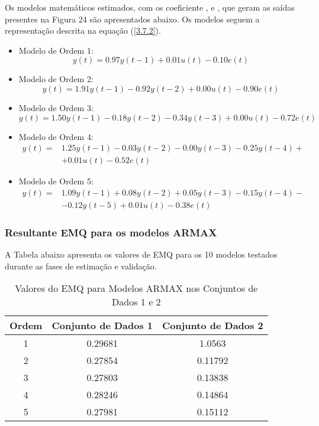 \documentclass[a4paper,12pt]{article}
\begin{document}
Os modelos matemáticos estimados, com os coeficiente ,  e , que geram as saídas presentes na Figura 24 são apresentados abaixo. Os modelos seguem a representação descrita na equação (\ref{3.7.2}).
\begin{itemize}
    \item Modelo de Ordem 1:
    \begin{equation*}
    y(t) = 0.97y(t-1) + 0.01u(t) - 0.10e(t)
    \end{equation*}
    
    \item Modelo de Ordem 2:
    \begin{equation*}
    y(t) = 1.91y(t-1) - 0.92y(t-2) + 0.00u(t) - 0.90e(t)
    \end{equation*}
    
    \item Modelo de Ordem 3:
    \begin{equation*}
    y(t) = 1.50y(t-1) - 0.18y(t-2) - 0.34y(t-3) + 0.00u(t) - 0.72e(t)
    \end{equation*}
    
    \item Modelo de Ordem 4:
    \begin{align}
    y(t) = &1.25y(t-1) - 0.03y(t-2) - 0.00y(t-3) - 0.25y(t-4) + \nonumber\\
    & + 0.01u(t) - 0.52e(t) \nonumber
    \end{align}
    
    \item Modelo de Ordem 5:
    \begin{align}
    y(t) = &1.09y(t-1) + 0.08y(t-2) + 0.05y(t-3) - 0.15y(t-4) -\nonumber \\
    & - 0.12y(t-5) + 0.01u(t) - 0.38e(t) \nonumber
    \end{align}
\end{itemize}

\subsubsection{Resultante EMQ para os modelos ARMAX}

A Tabela abaixo apresenta os valores de EMQ para os 10 modelos testados durante as fases de estimação e validação.

\begin{table}[h!]
    \centering
    \label{tab:emq_results_armax}
    \begin{tabular}{|c|c|c|}
        \hline
        Ordem & Conjunto de Dados 1 & Conjunto de Dados 2 \\
        \hline
        1 & 0.29681 & 1.0563 \\
        2 & 0.27854 & 0.11792 \\
        3 & 0.27803 & 0.13838 \\
        4 & 0.28246 & 0.14864 \\
        5 & 0.27981 & 0.15112 \\
        \hline
    \end{tabular}
    \caption{Valores do EMQ para Modelos ARMAX nos Conjuntos de Dados 1 e 2}
\end{table}
\end{document}
